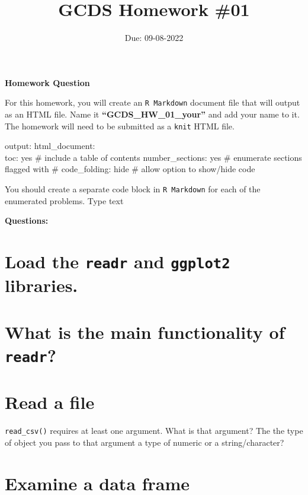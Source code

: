 \documentclass[
]{article}
\title{GCDS Homework \#01}
\author{}
\date{\vspace{-2.5em}Due: 09-08-2022}
\begin{document}
\maketitle

{
\setcounter{tocdepth}{2}
\tableofcontents
}
\textbf{Homework Question}

For this homework, you will create an \texttt{R\ Markdown} document file
that will output as an HTML file. Name it
\textbf{``GCDS\_HW\_01\_your''} and add your name to it. The homework
will need to be submitted as a \texttt{knit} HTML file.

output: html\_document:\\
toc: yes \# include a table of contents number\_sections: yes \#
enumerate sections flagged with \# code\_folding: hide \# allow option
to show/hide code

You should create a separate code block in \texttt{R\ Markdown} for each
of the enumerated problems. Type text

\textbf{Questions:}

\hypertarget{load-the-readr-and-ggplot2-libraries.}{%
\section{\texorpdfstring{Load the \texttt{readr} and \texttt{ggplot2}
libraries.}{Load the readr and ggplot2 libraries.}}\label{load-the-readr-and-ggplot2-libraries.}}

\hypertarget{what-is-the-main-functionality-of-readr}{%
\section{\texorpdfstring{What is the main functionality of
\texttt{readr}?}{What is the main functionality of readr?}}\label{what-is-the-main-functionality-of-readr}}

\hypertarget{read-a-file}{%
\section{Read a file}\label{read-a-file}}

\texttt{read\_csv()} requires at least one argument. What is that
argument? The the type of object you pass to that argument a type of
numeric or a string/character?

\hypertarget{examine-a-data-frame}{%
\section{Examine a data frame}\label{examine-a-data-frame}}
\end{document}
